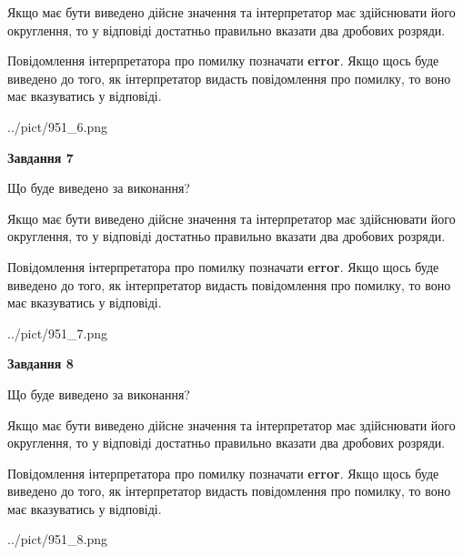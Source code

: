 \documentclass[12pt, ukrainian]{article}
\begin{document}
{\begin {Large}
Якщо має бути виведено дійсне значення та інтерпретатор має здійснювати його округлення, 
то у відповіді достатньо правильно вказати два дробових розряди.

Повідомлення інтерпретатора про помилку позначати \textbf{error}.
Якщо щось буде виведено до того, як інтерпретатор видасть повідомлення про помилку, 
то воно має вказуватись у відповіді. \par

\begin{center}
	{../pict/951_6.png}
\end{center}
\newpage

{\begin {center}\textbf{Завдання 7}\end {center}}\par
Що буде виведено за виконання? \par

Якщо має бути виведено дійсне значення та інтерпретатор має здійснювати його округлення, 
то у відповіді достатньо правильно вказати два дробових розряди.

Повідомлення інтерпретатора про помилку позначати \textbf{error}.
Якщо щось буде виведено до того, як інтерпретатор видасть повідомлення про помилку, 
то воно має вказуватись у відповіді. \par

\begin{center}
	{../pict/951_7.png}
\end{center}
\newpage

{\begin {center}\textbf{Завдання 8}\end {center}}\par
Що буде виведено за виконання? \par

Якщо має бути виведено дійсне значення та інтерпретатор має здійснювати його округлення, 
то у відповіді достатньо правильно вказати два дробових розряди.

Повідомлення інтерпретатора про помилку позначати \textbf{error}.
Якщо щось буде виведено до того, як інтерпретатор видасть повідомлення про помилку, 
то воно має вказуватись у відповіді. \par

\begin{center}
	{../pict/951_8.png}
\end{center}
\newpage


\end{Large}}
\end{document}
